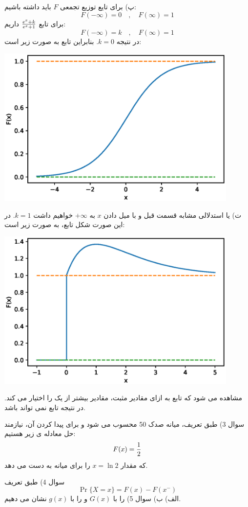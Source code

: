 \documentclass[10pt,letterpaper]{article}
\begin{document}
پ) برای تایع توزیع تجمعی $F$ باید داشته باشیم:
$$
F(-\infty)=0\quad,\quad F(\infty)=1
$$
برای تابع 
$
{e^x+k\over e^x+1}
$
داریم:
$$
F(-\infty)=k\quad,\quad F(\infty)=1
$$
در نتیجه $k=0$. بنابراین تابع  به صورت زیر است:
\begin{center}
\includegraphics[width=120mm]{Q2B.eps}
\end{center}
ت) یا استدلالی مشابه قسمت قبل و با میل دادن $x$ به $+\infty$ خواهیم داشت $k=1$. در این صورت شکل تابع، به صورت زیر است:
\begin{center}
\includegraphics[width=120mm]{Q2C.eps}
\end{center}
مشاهده می شود که تابع به ازای مقادیر مثبت، مقادیر بیشتر از یک را اختیار می کند. در نتیجه تابع نمی تواند  باشد.

سوال 3) طبق تعریف، میانه صدک 50 محسوب می شود و برای پیدا کردن آن، نیازمند حل معادله ی زیر هستیم:
$$
F(x)={1\over 2}
$$
 که مقدار $x=\ln2$ را برای میانه به دست می دهد.

سوال 4) طبق تعریف
$$
\Pr\{X=x\}=F(x)-F(x^-)
$$
الف)
ب)
سوال 5)  را با $G(x)$ و  را با $g(x)$ نشان می دهیم.
\end{document}
